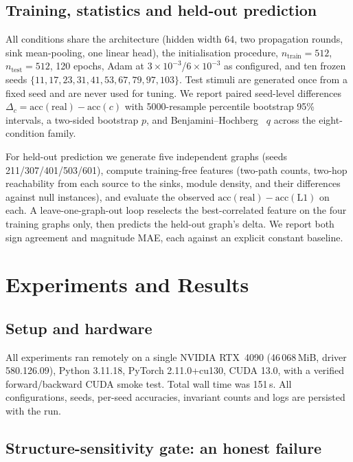 \documentclass[10pt,twocolumn,letterpaper]{article}
\begin{document}
\subsection{Training, statistics and held-out prediction}
\label{sec:protocol}

All conditions share the architecture (hidden width 64, two propagation
rounds, sink mean-pooling, one linear head), the initialisation procedure,
$n_{\text{train}}=512$, $n_{\text{test}}=512$, 120 epochs, Adam at
$3\!\times\!10^{-3}$/$6\!\times\!10^{-3}$ as configured, and ten frozen seeds
$\{11,17,23,31,41,53,67,79,97,103\}$. Test stimuli are generated once from a
fixed seed and are never used for tuning. We report paired seed-level
differences $\Delta_c = \mathrm{acc}(\text{real}) - \mathrm{acc}(c)$ with
5000-resample percentile bootstrap 95\% intervals, a two-sided bootstrap $p$,
and Benjamini--Hochberg~\cite{benjamini1995} $q$ across the eight-condition family.

For held-out prediction we generate five independent graphs (seeds
211/307/401/503/601), compute training-free features (two-path counts,
two-hop reachability from each source to the sinks, module density, and their
differences against null instances), and evaluate the observed
$\mathrm{acc}(\text{real})-\mathrm{acc}(\text{L1})$ on each. A
leave-one-graph-out loop reselects the best-correlated feature on the four
training graphs only, then predicts the held-out graph's delta. We report both
sign agreement and magnitude MAE, each against an explicit constant baseline.

\section{Experiments and Results}
\label{sec:exp}

\subsection{Setup and hardware}
\label{sec:setup}

All experiments ran remotely on a single NVIDIA RTX~4090 (46\,068\,MiB,
driver 580.126.09), Python 3.11.18, PyTorch 2.11.0+cu130, CUDA 13.0, with a
verified forward/backward CUDA smoke test. Total wall time was 151\,s. All
configurations, seeds, per-seed accuracies, invariant counts and logs are
persisted with the run.

\subsection{Structure-sensitivity gate: an honest failure}
\label{sec:gate}
\end{document}
